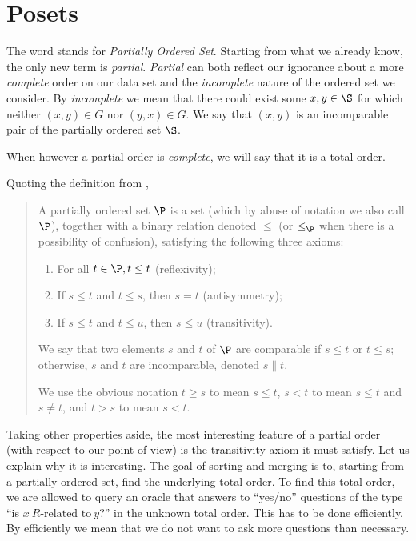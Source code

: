 \section{Posets}

The word  stands for \emph{Partially Ordered Set}. Starting from
what we already know, the only new term is \emph{partial}. \emph{Partial} can
both reflect our ignorance about a more \emph{complete} order on our data set
and the \emph{incomplete} nature of the ordered set we consider. By
\emph{incomplete} we mean that there could exist some $x, y \in \S$ for which
neither $(x, y) \in G$ nor $(y, x) \in G$. We say that $(x,y)$ is an
incomparable pair of the partially ordered set \(\S\).


When however a partial order is \emph{complete}, we will say that it is a total
order.

Quoting the definition from \citet*{Stanley:2011:ECV:2124415},

\begin{quotation}

A partially ordered set $\P$ is a set (which by abuse of notation we also call
$\P$), together with a binary relation denoted $\leq$ (or $\leq_{\P}$ when there is
a possibility of confusion), satisfying the following three axioms:

\begin{enumerate}
\item For all $t \in \P, t \leq t$ (reflexivity);
\item If $s \leq t$ and $t \leq s$, then $s = t$ (antisymmetry);
\item If $s \leq t$ and $t \leq u$, then $s \leq u$ (transitivity).
\end{enumerate}

We say that two elements $s$ and $t$ of $\P$ are comparable if $s \leq t$ or $t
\leq s$; otherwise, $s$ and $t$ are incomparable, denoted $s \parallel t$.

We use the obvious notation $t \geq s$ to mean $s \leq t$, $s < t$ to mean $s
\leq t$ and $s \neq t$, and $t > s$ to mean $s < t$.

\end{quotation}

Taking other properties aside, the most interesting feature of a partial order
(with respect to our point of view) is the transitivity axiom it must satisfy.
Let us explain why it is interesting. The goal of sorting and merging is to,
starting from a partially ordered set, find the underlying total order. To find
this total order, we are allowed to query an oracle that answers to ``yes/no''
questions of the type ``is $x~R\text{-related to}~y$?'' in the unknown total
order. This has to be done efficiently. By efficiently we mean that we do not
want to ask more questions than necessary.

